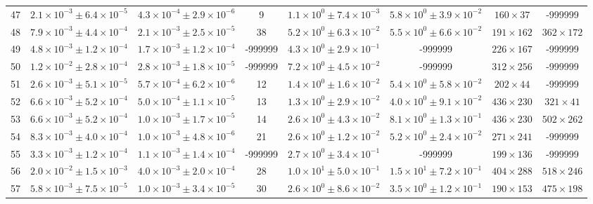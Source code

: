 \begin{table}
\begin{tabular}{cccccccc}
47 & $2.1\times10^{-3}\pm 6.4\times10^{-5}$ & $4.3\times10^{-4}\pm 2.9\times10^{-6}$ & 9 & $1.1\times10^{0}\pm 7.4\times10^{-3}$ & $5.8\times10^{0}\pm 3.9\times10^{-2}$ & $160\times 37$ & -999999 \\
48 & $7.9\times10^{-3}\pm 4.4\times10^{-4}$ & $2.1\times10^{-3}\pm 2.5\times10^{-5}$ & 38 & $5.2\times10^{0}\pm 6.3\times10^{-2}$ & $5.5\times10^{0}\pm 6.6\times10^{-2}$ & $191\times 162$ & $362\times 172$ \\
49 & $4.8\times10^{-3}\pm 1.2\times10^{-4}$ & $1.7\times10^{-3}\pm 1.2\times10^{-4}$ & -999999 & $4.3\times10^{0}\pm 2.9\times10^{-1}$ & -999999 & $226\times 167$ & -999999 \\
50 & $1.2\times10^{-2}\pm 2.8\times10^{-4}$ & $2.8\times10^{-3}\pm 1.8\times10^{-5}$ & -999999 & $7.2\times10^{0}\pm 4.5\times10^{-2}$ & -999999 & $312\times 256$ & -999999 \\
51 & $2.6\times10^{-3}\pm 5.1\times10^{-5}$ & $5.7\times10^{-4}\pm 6.2\times10^{-6}$ & 12 & $1.4\times10^{0}\pm 1.6\times10^{-2}$ & $5.4\times10^{0}\pm 5.8\times10^{-2}$ & $202\times 44$ & -999999 \\
52 & $6.6\times10^{-3}\pm 5.2\times10^{-4}$ & $5.0\times10^{-4}\pm 1.1\times10^{-5}$ & 13 & $1.3\times10^{0}\pm 2.9\times10^{-2}$ & $4.0\times10^{0}\pm 9.1\times10^{-2}$ & $436\times 230$ & $321\times 41$ \\
53 & $6.6\times10^{-3}\pm 5.2\times10^{-4}$ & $1.0\times10^{-3}\pm 1.7\times10^{-5}$ & 14 & $2.6\times10^{0}\pm 4.3\times10^{-2}$ & $8.1\times10^{0}\pm 1.3\times10^{-1}$ & $436\times 230$ & $502\times 262$ \\
54 & $8.3\times10^{-3}\pm 4.0\times10^{-4}$ & $1.0\times10^{-3}\pm 4.8\times10^{-6}$ & 21 & $2.6\times10^{0}\pm 1.2\times10^{-2}$ & $5.2\times10^{0}\pm 2.4\times10^{-2}$ & $271\times 241$ & -999999 \\
55 & $3.3\times10^{-3}\pm 1.2\times10^{-4}$ & $1.1\times10^{-3}\pm 1.4\times10^{-4}$ & -999999 & $2.7\times10^{0}\pm 3.4\times10^{-1}$ & -999999 & $199\times 136$ & -999999 \\
56 & $2.0\times10^{-2}\pm 1.5\times10^{-3}$ & $4.0\times10^{-3}\pm 2.0\times10^{-4}$ & 28 & $1.0\times10^{1}\pm 5.0\times10^{-1}$ & $1.5\times10^{1}\pm 7.2\times10^{-1}$ & $404\times 288$ & $518\times 246$ \\
57 & $5.8\times10^{-3}\pm 7.5\times10^{-5}$ & $1.0\times10^{-3}\pm 3.4\times10^{-5}$ & 30 & $2.6\times10^{0}\pm 8.6\times10^{-2}$ & $3.5\times10^{0}\pm 1.2\times10^{-1}$ & $190\times 153$ & $475\times 198$ \\

\end{tabular}
\end{table}
